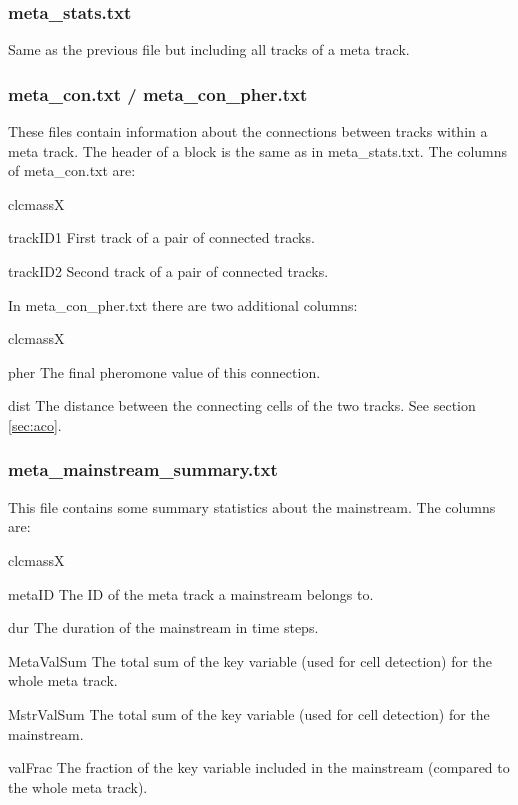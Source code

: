 \documentclass{scrartcl}
\begin{document}
\subsubsection{meta\_stats.txt}
Same as the previous file but including all tracks of a meta track.

\subsubsection{meta\_con.txt / meta\_con\_pher.txt}
These files contain information about the connections between tracks within a meta track. The header of a block is the same as in meta\_stats.txt. The columns of meta\_con.txt are:
\begin{labeling}{clcmassX}
	\item[trackID1] First track of a pair of connected tracks.
	\item[trackID2] Second track of a pair of connected tracks.
\end{labeling}
In meta\_con\_pher.txt there are two additional columns:
\begin{labeling}{clcmassX}
	\item[pher] The final pheromone value of this connection.
	\item[dist] The distance between the connecting cells of the two tracks. See section \ref{sec:aco}.
\end{labeling}

\subsubsection{meta\_mainstream\_summary.txt}
This file contains some summary statistics about the mainstream. The columns are:
\begin{labeling}{clcmassX}
	\item[metaID] The ID of the meta track a mainstream belongs to.
	\item[dur] The duration of the mainstream in time steps.
	\item[MetaValSum] The total sum of the key variable (used for cell detection) for the whole meta track.
    \item[MstrValSum] The total sum of the key variable (used for cell detection) for the mainstream.
	\item[valFrac] The fraction of the key variable included in the mainstream (compared to the whole meta track).
\end{labeling}

\newpage


\end{document}

